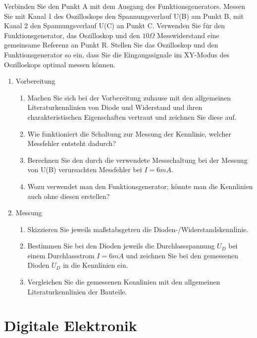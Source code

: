 \documentclass[paper=a4, fontsize=11pt]{scrartcl}
\numberwithin{equation}{section}
\numberwithin{figure}{section}
\numberwithin{table}{section}
\begin{document}
Verbinden Sie den Punkt A mit dem Ausgang des Funktionsgenerators. Messen Sie mit Kanal 1 des Oszilloskops den Spannungsverlauf U(B) am Punkt B, mit Kanal 2 den Spannungsverlauf U(C) an Punkt C. Verwenden Sie für den Funktionsgenerator, das Oszilloskop und den $10 \Omega$ Messwiderstand eine gemeinsame Referenz an Punkt R. Stellen Sie das Oszilloskop und den Funktionsgenerator so ein, dass Sie die Eingangssignale im XY-Modus des Oszilloskops optimal messen können. \\

\begin{enumerate}

\item Vorbereitung
\begin{enumerate}
\item Machen Sie sich bei der Vorbereitung zuhause mit den allgemeinen Literaturkennlinien von Diode und Widerstand und ihren charakteristischen Eigenschaften vertraut und zeichnen Sie diese auf.
\item Wie funktioniert die Schaltung zur Messung der Kennlinie, welcher Messfehler entsteht dadurch?
\item Berechnen Sie den durch die verwendete Messschaltung bei der Messung von U(B) verursachten Messfehler bei $I = 6 mA$.
\item Wozu verwendet man den Funktionsgenerator; könnte man die Kennlinien auch ohne diesen erstellen?
\end{enumerate}

\item Messung
\begin{enumerate}
\item Skizzieren Sie jeweils maßstabsgetreu die Dioden-/Widerstandskennlinie.
\item Bestimmen Sie bei den Dioden jeweils die Durchlassspannung $U_{D}$ bei einem Durchlassstrom $I = 6 mA$ und zeichnen Sie bei den gemessenen Dioden $U_{D}$ in die Kennlinien ein.
\item Vergleichen Sie die gemessenen Kennlinien mit den allgemeinen Literaturkennlinien der Bauteile.
\end{enumerate}
\end{enumerate}


\newpage

\section{Digitale Elektronik}
\end{document}
